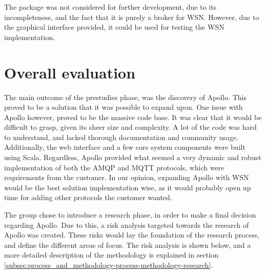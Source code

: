 The package was not considered for further development, due to its incompleteness, and the fact that it is purely a broker for WSN. However, due to the graphical interface provided, it could be used for testing the WSN implementation.

\section{Overall evaluation}
\label{sec:prestudies-overall_evaluation}

The main outcome of the prestudies phase, was the discovery of Apollo. This proved to be a solution that it was possible to expand upon. One issue with Apollo however, proved to be the massive code base. It was clear that it would be difficult to grasp, given its sheer size and complexity. A lot of the code was hard to understand, and lacked thorough documentation and community usage. Additionally, the web interface and a few core system components were built using Scala. Regardless, Apollo provided what seemed a very dynamic and robust implementation of both the AMQP and MQTT protocols, which were requirements from the customer. In our opinion, expanding Apollo with WSN would be the best solution implementation wise, as it would probably open up time for adding other protocols the customer wanted.

The group chose to introduce a research phase, in order to make a final decision regarding Apollo. Due to this, a risk analysis targeted towards the research of Apollo was created. These risks would lay the foundation of the research process, and define the different areas of focus. The risk analysis is shown below, and a more detailed description of the methodology is explained in section \ref{subsec:process_and_methodology-process-methodology-research}.

